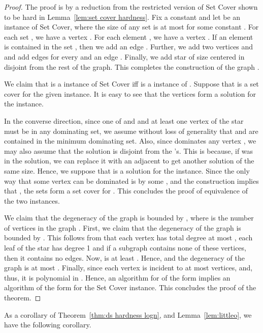 \begin{proof}
The proof is by a reduction from the restricted version of {\sc Set Cover} shown to be hard in Lemma~\ref{lem:set cover hardness}. Fix a constant  and let  be an instance of {\sc Set Cover}, where the size of any set is at most  for some constant . For each set , we have a vertex . For each element , we have a vertex . If an element  is contained in the set , then we add an edge . Further, we add two vertices  and  and add edges  for every  and an edge . Finally, we add star of size  centered in  disjoint from the rest of the graph. This completes the construction of the graph . 

We claim that  is a {\Yes} instance of {\sc Set Cover} iff  is a {\Yes} instance of {\ds}. Suppose that  is a set cover for the given instance. It is easy to see that the vertices  form a solution for the {\ds} instance.

In the converse direction, since one of  and  and at least one vertex of the star must be in any dominating set, we assume without loss of generality that  and  are contained in the minimum dominating set. Also, since  dominates any vertex , we may also assume that the solution is disjoint from the 's. This is because, if  was in the solution, we can replace it with an adjacent  to get another solution of the same size. Hence, we suppose that  is a solution for the {\ds} instance. Since the only way that some vertex  can be dominated is by some , and the construction implies that , the sets  form a set cover for . This concludes the proof of equivalence of the two instances.

We claim that the degeneracy of the graph  is bounded by , where  is the number of vertices in the graph . First, we claim that the degeneracy of the graph  is bounded by . This follows from that each vertex  has total degree at most , each leaf of the star has degree 1 and if a subgraph contains none of these vertices, then it contains no edges.  Now,  is at least . Hence,  and the degeneracy of the graph is at most . Finally, since each vertex  is incident to at most  vertices,  and, thus, it is polynomial in . Hence, an algorithm for {\ds} of the form  implies an algorithm of the form  for the {\sc Set Cover} instance. This concludes the proof of the theorem.
\end{proof}



\noindent
As a corollary of Theorem~\ref{thm:ds hardness logn}, and Lemma~\ref{lem:littleo}, we have the following corollary.



